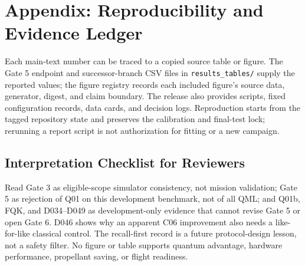 \appendix
\section*{Appendix: Reproducibility and Evidence Ledger}

Each main-text number can be traced to a copied source table or figure. The
Gate 5 endpoint and successor-branch CSV files in \texttt{results\_tables/}
supply the reported values; the figure registry records each included figure's
source data, generator, digest, and claim boundary. The release also provides
scripts, fixed configuration records, data cards, and decision logs.
Reproduction starts from the tagged repository state and preserves the
calibration and final-test lock; rerunning a report script is not authorization
for fitting or a new campaign.

\subsection*{Interpretation Checklist for Reviewers}

Read Gate 3 as eligible-scope simulator consistency, not mission validation;
Gate 5 as rejection of Q01 on this development benchmark, not of all QML; and
Q01b, FQK, and D034--D049 as development-only evidence that cannot revise Gate
5 or open Gate 6. D046 shows why an apparent C06 improvement also needs a
like-for-like classical control. The recall-first record is a future
protocol-design lesson, not a safety filter. No figure or table supports
quantum advantage, hardware performance, propellant saving, or flight
readiness.
